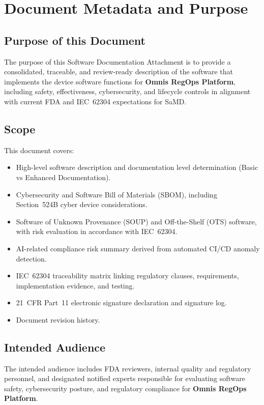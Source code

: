 \documentclass[11pt]{article}
\begin{document}
\setcounter{page}{1}

\tableofcontents
\newpage

\section{Document Metadata and Purpose}

\subsection{Purpose of this Document}
The purpose of this Software Documentation Attachment is to provide a consolidated,
traceable, and review-ready description of the software that implements the device
software functions for \textbf{Omnis RegOps Platform}, including safety, effectiveness,
cybersecurity, and lifecycle controls in alignment with current FDA and IEC~62304
expectations for SaMD.

\subsection{Scope}
This document covers:
\begin{itemize}
    \item High-level software description and documentation level determination
          (Basic vs Enhanced Documentation).
    \item Cybersecurity and Software Bill of Materials (SBOM), including
          Section~524B cyber device considerations.
    \item Software of Unknown Provenance (SOUP) and Off-the-Shelf (OTS) software,
          with risk evaluation in accordance with IEC~62304.
    \item AI-related compliance risk summary derived from automated CI/CD anomaly
          detection.
    \item IEC~62304 traceability matrix linking regulatory clauses, requirements,
          implementation evidence, and testing.
    \item 21~CFR Part~11 electronic signature declaration and signature log.
    \item Document revision history.
\end{itemize}

\subsection{Intended Audience}
The intended audience includes FDA reviewers, internal quality and regulatory
personnel, and designated notified experts responsible for evaluating software
safety, cybersecurity posture, and regulatory compliance for
\textbf{Omnis RegOps Platform}.
\end{document}
